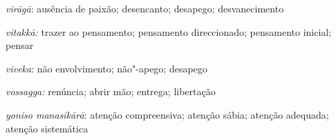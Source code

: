 \begin{glossarydescription}
  \emph{virāgā}: ausência de paixão; desencanto; desapego; desvanecimento

  \emph{vitakkā:} trazer ao pensamento; pensamento direccionado; pensamento inicial; pensar

  \emph{viveka}: não envolvimento; não"-apego; desapego

  \emph{vossagga:} renúncia; abrir mão; entrega; libertação

  \emph{yoniso manasikārā}: atenção compreensiva; atenção sábia; atenção adequada; atenção sistemática






















\end{glossarydescription}

